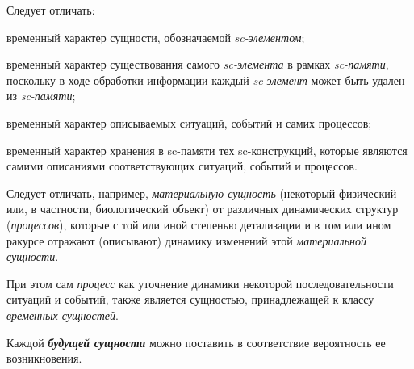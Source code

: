 Следует отличать:
	\begin{textitemize}
		\item временный характер сущности, обозначаемой \textit{sc-элементом};
		\item временный характер существования самого \textit{sc-элемента} в рамках \textit{sc-памяти}, поскольку в ходе обработки информации каждый \textit{sc-элемент} может быть удален из \textit{sc-памяти}; 
		\item временный характер описываемых ситуаций, событий и самих процессов;
		\item временный характер хранения в sc-памяти тех sc-конструкций, которые являются самими описаниями соответствующих ситуаций, событий и процессов.
	\end{textitemize}

		
Следует отличать, например, \textit{материальную сущность} (некоторый физический или, в частности, биологический объект) от различных динамических структур (\textit{процессов}), которые с той или иной степенью детализации и в том или ином ракурсе отражают (описывают) динамику изменений этой \textit{материальной сущности}. 
			
При этом сам \textit{процесс} как уточнение динамики некоторой последовательности ситуаций и событий, также является сущностью, принадлежащей к классу \textit{временных сущностей}.
		
\begin{SCn}
		
		
\end{SCn}

Каждой \textbf{\textit{будущей сущности}} можно поставить в соответствие вероятность ее возникновения.
	
\begin{SCn}
\end{SCn}

